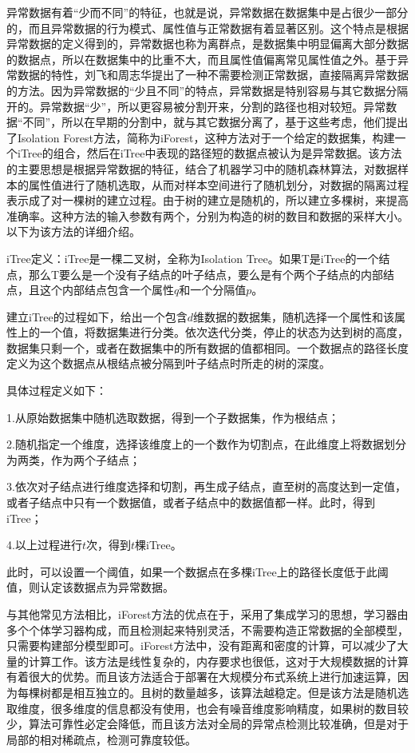异常数据有着“少而不同”的特征，也就是说，异常数据在数据集中是占很少一部分的，而且异常数据的行为模式、属性值与正常数据有着显著区别。这个特点是根据异常数据的定义得到的，异常数据也称为离群点，是数据集中明显偏离大部分数据的数据点，所以在数据集中的比重不大，而且属性值偏离常见属性值之外。基于异常数据的特性，刘飞和周志华提出了一种不需要检测正常数据，直接隔离异常数据的方法。因为异常数据的“少且不同”的特点，异常数据是特别容易与其它数据分隔开的。异常数据“少”，所以更容易被分割开来，分割的路径也相对较短。异常数据“不同”，所以在早期的分割中，就与其它数据分离了，基于这些考虑，他们提出了Isolation Forest方法，简称为iForest，这种方法对于一个给定的数据集，构建一个iTree的组合，然后在iTree中表现的路径短的数据点被认为是异常数据。该方法的主要思想是根据异常数据的特征，结合了机器学习中的随机森林算法，对数据样本的属性值进行了随机选取，从而对样本空间进行了随机划分，对数据的隔离过程表示成了对一棵树的建立过程。由于树的建立是随机的，所以建立多棵树，来提高准确率。这种方法的输入参数有两个，分别为构造的树的数目和数据的采样大小。以下为该方法的详细介绍。

iTree定义：iTree是一棵二叉树，全称为Isolation Tree。如果T是iTree的一个结点，那么T要么是一个没有子结点的叶子结点，要么是有个两个子结点的内部结点，且这个内部结点包含一个属性$q$和一个分隔值$p$。

建立iTree的过程如下，给出一个包含$d$维数据的数据集，随机选择一个属性和该属性上的一个值，将数据集进行分类。依次迭代分类，停止的状态为达到树的高度，数据集只剩一个，或者在数据集中的所有数据的值都相同。一个数据点的路径长度定义为这个数据点从根结点被分隔到叶子结点时所走的树的深度。

具体过程定义如下：

1.从原始数据集中随机选取数据，得到一个子数据集，作为根结点；

2.随机指定一个维度，选择该维度上的一个数作为切割点，在此维度上将数据划分为两类，作为两个子结点；

3.依次对子结点进行维度选择和切割，再生成子结点，直至树的高度达到一定值，或者子结点中只有一个数据值，或者子结点中的数据值都一样。此时，得到iTree；

4.以上过程进行$t$次，得到$t$棵iTree。

此时，可以设置一个阈值，如果一个数据点在多棵iTree上的路径长度低于此阈值，则认定该数据点为异常数据。

与其他常见方法相比，iForest方法的优点在于，采用了集成学习的思想，学习器由多个个体学习器构成，而且检测起来特别灵活，不需要构造正常数据的全部模型，只需要构建部分模型即可。iForest方法中，没有距离和密度的计算，可以减少了大量的计算工作。该方法是线性复杂的，内存要求也很低，这对于大规模数据的计算有着很大的优势。而且该方法适合于部署在大规模分布式系统上进行加速运算，因为每棵树都是相互独立的。且树的数量越多，该算法越稳定。但是该方法是随机选取维度，很多维度的信息都没有使用，也会有噪音维度影响精度，如果树的数目较少，算法可靠性必定会降低，而且该方法对全局的异常点检测比较准确，但是对于局部的相对稀疏点，检测可靠度较低。

